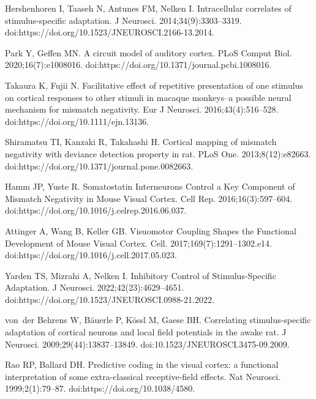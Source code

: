 \documentclass[10pt,letterpaper]{article}
\begin{document}
\begin{thebibliography}{100}
  Hershenhoren I, Taaseh N, Antunes FM, Nelken I.
  \newblock Intracellular correlates of stimulus-specific adaptation.
  \newblock J Neurosci. 2014;34(9):3303--3319.
  \newblock doi:{https://doi.org/10.1523/JNEUROSCI.2166-13.2014}.
  
  Park Y, Geffen MN.
  \newblock A circuit model of auditory cortex.
  \newblock PLoS Comput Biol. 2020;16(7):e1008016.
  \newblock doi:{https://doi.org/10.1371/journal.pcbi.1008016}.
  
  Takaura K, Fujii N.
  \newblock Facilitative effect of repetitive presentation of one stimulus on
    cortical responses to other stimuli in macaque monkeys--a possible neural
    mechanism for mismatch negativity.
  \newblock Eur J Neurosci. 2016;43(4):516--528.
  \newblock doi:{https://doi.org/10.1111/ejn.13136}.
  
  Shiramatsu TI, Kanzaki R, Takahashi H.
  \newblock Cortical mapping of mismatch negativity with deviance detection
    property in rat.
  \newblock PLoS One. 2013;8(12):e82663.
  \newblock doi:{https://doi.org/10.1371/journal.pone.0082663}.
  
  Hamm JP, Yuste R.
  \newblock Somatostatin Interneurons Control a Key Component of Mismatch
    Negativity in Mouse Visual Cortex.
  \newblock Cell Rep. 2016;16(3):597--604.
  \newblock doi:{https://doi.org/10.1016/j.celrep.2016.06.037}.
  
  Attinger A, Wang B, Keller GB.
  \newblock Visuomotor {Coupling} {Shapes} the {Functional} {Development} of
    {Mouse} {Visual} {Cortex}.
  \newblock Cell. 2017;169(7):1291--1302.e14.
  \newblock doi:{https://doi.org/10.1016/j.cell.2017.05.023}.
  
  Yarden TS, Mizrahi A, Nelken I.
   Inhibitory Control of {Stimulus-Specific}
    Adaptation.
  \newblock J Neurosci. 2022;42(23):4629--4651.
  \newblock doi:{https://doi.org/10.1523/JNEUROSCI.0988-21.2022}.
  
  von~der Behrens W, B{\"a}uerle P, K{\"o}ssl M, Gaese BH.
  \newblock Correlating stimulus-specific adaptation of cortical neurons and
    local field potentials in the awake rat.
  \newblock J Neurosci. 2009;29(44):13837--13849.
  \newblock doi:{10.1523/JNEUROSCI.3475-09.2009}.
  
  Rao RP, Ballard DH.
  \newblock Predictive coding in the visual cortex: a functional interpretation
    of some extra-classical receptive-field effects.
  \newblock Nat Neurosci. 1999;2(1):79--87.
  \newblock doi:{https://doi.org/10.1038/4580}.
  

\end{thebibliography}
\end{document}
